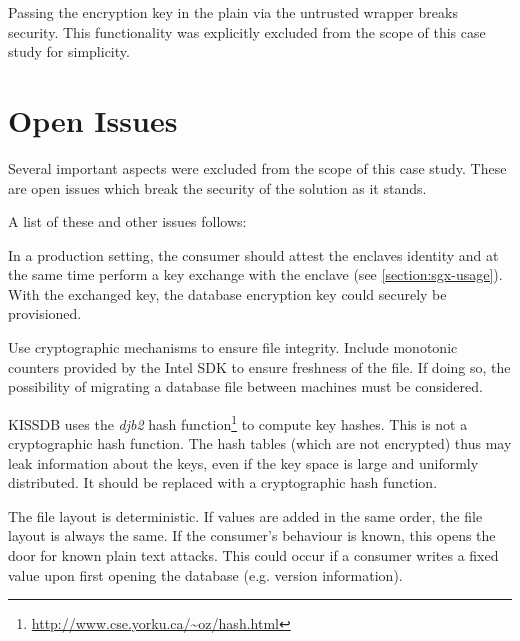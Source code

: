 \begin{description}
Passing the encryption key in the plain via the untrusted wrapper breaks security.\label{ID_384534507}
This functionality was explicitly excluded from the scope of this case study for simplicity.\label{ID_100727079}
\end{description}\label{ID_1648449345}

\section{Open Issues\label{ID_233809023}}
Several important aspects were excluded from the scope of this case study.\label{ID_1377485604}
These are open issues which break the security of the solution as it stands.\label{ID_1763867428}

A list of these and other issues follows:\label{ID_1114623328}
\begin{description}\label{ID_1915026761}
\item[Attestation and key provisioning:]\label{ID_1851814792}
In a production setting, the consumer should attest the enclaves identity and at the same time perform a key exchange with the enclave (see \autoref{section:sgx-usage}).\label{ID_1799640899}
With the exchanged key, the database encryption key could securely be provisioned.\label{ID_1258952538}
\item[Ensure file integrity and freshness:]\label{ID_1148171152}
Use cryptographic mechanisms to ensure file integrity.\label{ID_267021578}
Include monotonic counters provided by the Intel SDK to ensure freshness of the file.\label{ID_218946794}
If doing so, the possibility of migrating a database file between machines must be considered.\label{ID_103808527}
\item[Cryptographic hash function:]\label{ID_1853155964}
KISSDB uses the \textit{djb2} hash function\footnote{\url{http://www.cse.yorku.ca/~oz/hash.html}} to compute key hashes.\label{ID_201700884}
This is not a cryptographic hash function.\label{ID_187489868}
The hash tables (which are not encrypted) thus may leak information about the keys, even if the key space is large and uniformly distributed.\label{ID_728912015}
It should be replaced with a cryptographic hash function.\label{ID_286402682}
\item[Deterministic file layout:]\label{ID_171013750}
The file layout is deterministic.\label{ID_132950350}
If values are added in the same order, the file layout is always the same.\label{ID_755556391}
If the consumer's behaviour is known, this opens the door for known plain text attacks.\label{ID_630022390}
This could occur if a consumer writes a fixed value upon first opening the database (e.g. version information).\label{ID_1134366734}
\end{description}\label{ID_362813079}

